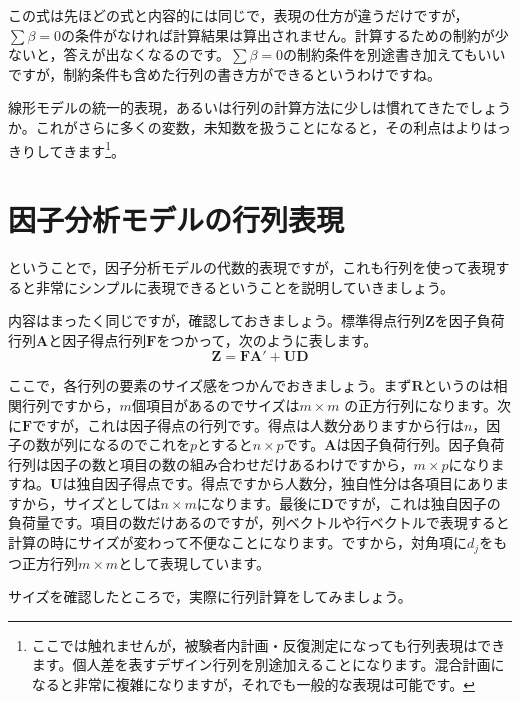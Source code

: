 \documentclass{ltjsbook}
\begin{document}
この式は先ほどの式と内容的には同じで，表現の仕方が違うだけですが，$\sum \beta= 0$の条件がなければ計算結果は算出されません。計算するための制約が少ないと，答えが出なくなるのです。$\sum \beta= 0$の制約条件を別途書き加えてもいいですが，制約条件も含めた行列の書き方ができるというわけですね。

線形モデルの統一的表現，あるいは行列の計算方法に少しは慣れてきたでしょうか。これがさらに多くの変数，未知数を扱うことになると，その利点はよりはっきりしてきます\footnote{ここでは触れませんが，被験者内計画・反復測定になっても行列表現はできます。個人差を表すデザイン行列を別途加えることになります。混合計画になると非常に複雑になりますが，それでも一般的な表現は可能です。}。

\section{ 因子分析モデルの行列表現}
ということで，因子分析モデルの代数的表現ですが，これも行列を使って表現すると非常にシンプルに表現できるということを説明していきましょう。

内容はまったく同じですが，確認しておきましょう。標準得点行列$\bm{Z}$を因子負荷行列$\bm{A}$と因子得点行列$\bm{F}$をつかって，次のように表します。
\begin{equation}
	\bm{Z} = \bm{F} \bm{A} ' + \bm{U} \bm{D}
\end{equation}

ここで，各行列の要素のサイズ感をつかんでおきましょう。まず$\bm{R}$というのは相関行列ですから，$m$個項目があるのでサイズは$m \times m$ の正方行列になります。次に$\bm{F}$ですが，これは因子得点の行列です。得点は人数分ありますから行は$n$，因子の数が列になるのでこれを$p$とすると$n\times p$です。$\bm{A}$は因子負荷行列。因子負荷行列は因子の数と項目の数の組み合わせだけあるわけですから，$m \times p$になりますね。$\bm{U}$は独自因子得点です。得点ですから人数分，独自性分は各項目にありますから，サイズとしては$n \times m$になります。最後に$\bm{D}$ですが，これは独自因子の負荷量です。項目の数だけあるのですが，列ベクトルや行ベクトルで表現すると計算の時にサイズが変わって不便なことになります。ですから，対角項に$d_j$をもつ正方行列$m \times m$として表現しています。

サイズを確認したところで，実際に行列計算をしてみましょう。
\end{document}

